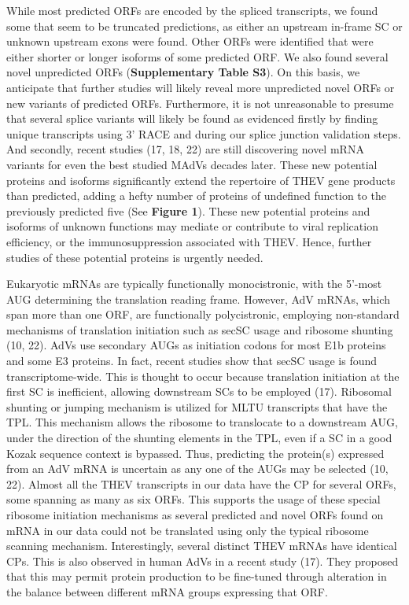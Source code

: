\documentclass[
]{article}
\begin{document}
While most predicted ORFs are encoded by the spliced transcripts, we
found some that seem to be truncated predictions, as either an upstream
in-frame SC or unknown upstream exons were found. Other ORFs were
identified that were either shorter or longer isoforms of some predicted
ORF. We also found several novel unpredicted ORFs (\textbf{Supplementary
Table S3}). On this basis, we anticipate that further studies will
likely reveal more unpredicted novel ORFs or new variants of predicted
ORFs. Furthermore, it is not unreasonable to presume that several splice
variants will likely be found as evidenced firstly by finding unique
transcripts using 3' RACE and during our splice junction validation
steps. And secondly, recent studies (17, 18, 22) are still discovering
novel mRNA variants for even the best studied MAdVs decades later. These
new potential proteins and isoforms significantly extend the repertoire
of THEV gene products than predicted, adding a hefty number of proteins
of undefined function to the previously predicted five (See
\textbf{Figure 1}). These new potential proteins and isoforms of unknown
functions may mediate or contribute to viral replication efficiency, or
the immunosuppression associated with THEV. Hence, further studies of
these potential proteins is urgently needed.

Eukaryotic mRNAs are typically functionally monocistronic, with the
5'-most AUG determining the translation reading frame. However, AdV
mRNAs, which span more than one ORF, are functionally polycistronic,
employing non-standard mechanisms of translation initiation such as
secSC usage and ribosome shunting (10, 22). AdVs use secondary AUGs as
initiation codons for most E1b proteins and some E3 proteins. In fact,
recent studies show that secSC usage is found transcriptome-wide. This
is thought to occur because translation initiation at the first SC is
inefficient, allowing downstream SCs to be employed (17). Ribosomal
shunting or jumping mechanism is utilized for MLTU transcripts that have
the TPL. This mechanism allows the ribosome to translocate to a
downstream AUG, under the direction of the shunting elements in the TPL,
even if a SC in a good Kozak sequence context is bypassed. Thus,
predicting the protein(s) expressed from an AdV mRNA is uncertain as any
one of the AUGs may be selected (10, 22). Almost all the THEV
transcripts in our data have the CP for several ORFs, some spanning as
many as six ORFs. This supports the usage of these special ribosome
initiation mechanisms as several predicted and novel ORFs found on mRNA
in our data could not be translated using only the typical ribosome
scanning mechanism. Interestingly, several distinct THEV mRNAs have
identical CPs. This is also observed in human AdVs in a recent study
(17). They proposed that this may permit protein production to be
fine-tuned through alteration in the balance between different mRNA
groups expressing that ORF.
\end{document}
